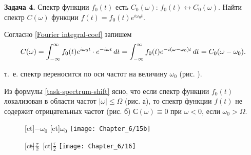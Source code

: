 \textbf{Задача 4.} Спектр функции $f_0(t)$ есть $C_0(\omega)$: $f_0(t)\leftrightarrow C_0(\omega)$. Найти спектр $C(\omega)$ функции $f(t)=f_0(t)e^{i\omega_0t}$.

Согласно \eqref{Fourier integral-coef} запишем
\begin{equation}
	\eqmark{task-spectrum-shift}
	C(\omega)=\int_{-\infty}^\infty f_0(t)e^{i\omega_0 t}\cdot e^{-i\omega t}\,dt=\int_{-\infty}^\infty
f_0(t)e^{-i(\omega-\omega_0)t}\,dt=C_0(\omega-\omega_0).
\end{equation}

\noindent т.~е. спектр переносится по оси частот на величину $\omega_0$ (рис. ).

Из формулы \eqref{task-spectrum-shift} ясно, что если спектр функции $f_0(t)$ локализован в области частот $|\omega|\le\Omega$ (рис. а),
то спектр функции $f(t)$ не содержит отрицательных частот (рис. б) $С(\omega)\equiv 0$ при $\omega<0$, если
$\omega_0>\Omega$.




%

\begin{figure}[h!]
	[ct]{$-\omega_0$}
	[ct]{$\omega_0$}
	\texttt{[image: Chapter\_6/15b]}
	\caption{}
\end{figure}
\begin{figure}[h!]
	[ct]{$\llap{$-$}\frac{\tau}{2}$}
	[ct]{$\frac{\tau}{2}$}
	\texttt{[image: Chapter\_6/16]}
	\caption{}
\end{figure}

